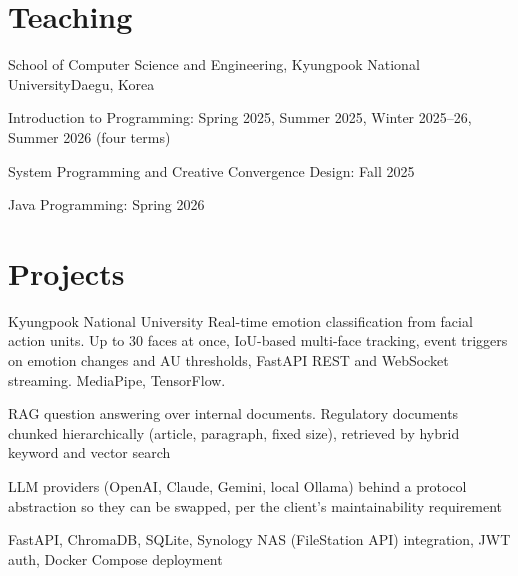 \documentclass[small]{cv}
\begin{document}
\section{Teaching}
  {School of Computer Science and Engineering, Kyungpook National University}{Daegu, Korea}
  {\begin{cvitems}
     \item Introduction to Programming: Spring 2025, Summer 2025, Winter 2025--26,
           Summer 2026 (four terms)
     \item System Programming and Creative Convergence Design: Fall 2025
     \item Java Programming: Spring 2026
   \end{cvitems}}

\section{Projects}
  {Kyungpook National University}
  {}
  {Real-time emotion classification from facial action units. Up to 30 faces at once,
   IoU-based multi-face tracking, event triggers on emotion changes and AU thresholds,
   FastAPI REST and WebSocket streaming. MediaPipe, TensorFlow.}

  {}
  {\begin{cvitems}
     \item RAG question answering over internal documents. Regulatory documents chunked
           hierarchically (article, paragraph, fixed size), retrieved by hybrid keyword
           and vector search
     \item LLM providers (OpenAI, Claude, Gemini, local Ollama) behind a protocol
           abstraction so they can be swapped, per the client's maintainability requirement
     \item FastAPI, ChromaDB, SQLite, Synology NAS (FileStation API) integration,
           JWT auth, Docker Compose deployment
   \end{cvitems}}
\end{document}
